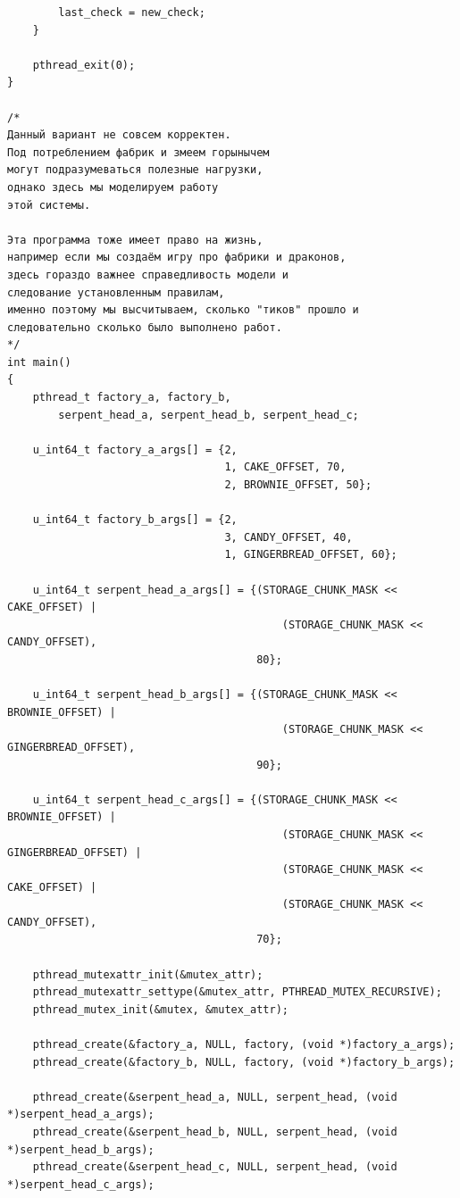 \documentclass[a4paper,14pt]{extarticle}
\begin{document}
\begin{verbatim}
        last_check = new_check;
    }

    pthread_exit(0);
}

/*
Данный вариант не совсем корректен.
Под потреблением фабрик и змеем горынычем
могут подразумеваться полезные нагрузки,
однако здесь мы моделируем работу
этой системы.

Эта программа тоже имеет право на жизнь,
например если мы создаём игру про фабрики и драконов,
здесь гораздо важнее справедливость модели и
следование установленным правилам,
именно поэтому мы высчитываем, сколько "тиков" прошло и
следовательно сколько было выполнено работ.
*/
int main()
{
    pthread_t factory_a, factory_b,
        serpent_head_a, serpent_head_b, serpent_head_c;

    u_int64_t factory_a_args[] = {2,
                                  1, CAKE_OFFSET, 70,
                                  2, BROWNIE_OFFSET, 50};

    u_int64_t factory_b_args[] = {2,
                                  3, CANDY_OFFSET, 40,
                                  1, GINGERBREAD_OFFSET, 60};

    u_int64_t serpent_head_a_args[] = {(STORAGE_CHUNK_MASK << CAKE_OFFSET) |
                                           (STORAGE_CHUNK_MASK << CANDY_OFFSET),
                                       80};

    u_int64_t serpent_head_b_args[] = {(STORAGE_CHUNK_MASK << BROWNIE_OFFSET) |
                                           (STORAGE_CHUNK_MASK << GINGERBREAD_OFFSET),
                                       90};

    u_int64_t serpent_head_c_args[] = {(STORAGE_CHUNK_MASK << BROWNIE_OFFSET) |
                                           (STORAGE_CHUNK_MASK << GINGERBREAD_OFFSET) |
                                           (STORAGE_CHUNK_MASK << CAKE_OFFSET) |
                                           (STORAGE_CHUNK_MASK << CANDY_OFFSET),
                                       70};

    pthread_mutexattr_init(&mutex_attr);
    pthread_mutexattr_settype(&mutex_attr, PTHREAD_MUTEX_RECURSIVE);
    pthread_mutex_init(&mutex, &mutex_attr);

    pthread_create(&factory_a, NULL, factory, (void *)factory_a_args);
    pthread_create(&factory_b, NULL, factory, (void *)factory_b_args);

    pthread_create(&serpent_head_a, NULL, serpent_head, (void *)serpent_head_a_args);
    pthread_create(&serpent_head_b, NULL, serpent_head, (void *)serpent_head_b_args);
    pthread_create(&serpent_head_c, NULL, serpent_head, (void *)serpent_head_c_args);


\end{verbatim}
\end{document}
